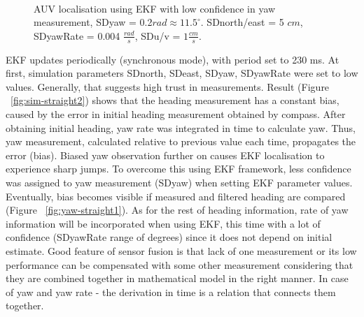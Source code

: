\begin{figure}%
  \centering
     \\
\caption{AUV localisation using EKF with low confidence in yaw measurement, SDyaw = 0.2$rad \approx 11.5 ^{\circ}$. SDnorth/east = 5 $cm$, SDyawRate = 0.004 $\frac{rad}{s}$, SDu/v = $1\frac{cm}{s}$.}
\label{fig:auv-sim-straight1}
\end{figure}    
    
EKF updates periodically (synchronous mode), with period set to 230 ms. At first, simulation parameters SDnorth, SDeast, SDyaw, SDyawRate were set to low values. Generally, that suggests high trust in measurements. Result (Figure ~\ref{fig:sim-straight2}) shows that the heading measurement has a constant bias, caused by the error in initial heading measurement obtained by compass. After obtaining initial heading, yaw rate was integrated in time to calculate yaw. Thus, yaw measurement, calculated relative to previous value each time, propagates the error (bias). Biased yaw observation further on causes EKF localisation to experience sharp jumps. To overcome this using EKF framework, less confidence was assigned to yaw measurement (SDyaw) when setting EKF parameter values. Eventually, bias becomes visible if measured and filtered heading are compared (Figure ~\ref{fig:yaw-straight1}). As for the rest of heading information, rate of yaw information will be incorporated when using EKF, this time with a lot of confidence (SDyawRate range of degrees) since it does not depend on initial estimate. Good feature of sensor fusion is that lack of one measurement or its low performance can be compensated with some other measurement considering that they are combined together in mathematical model in the right manner. In case of yaw and yaw rate - the derivation in time is a relation that connects them together. 

